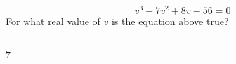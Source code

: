  
$$v^3-7v^2+8v-56=0 $$
For what real value of $v$ is the equation above true?\\\\


\ifsat
	\begin{enumerate}[label=\Alph*)]
	\end{enumerate}
\else
\fi

\ifacteven
	\begin{enumerate}[label=\textbf{\Alph*.},itemsep=\fill,align=left]
	\end{enumerate}
\else
\fi

\ifactodd
	\begin{enumerate}[label=\textbf{\Alph*.},itemsep=\fill,align=left]
	\end{enumerate}
\else
\fi

\ifgridin
$7$
\else
\fi

